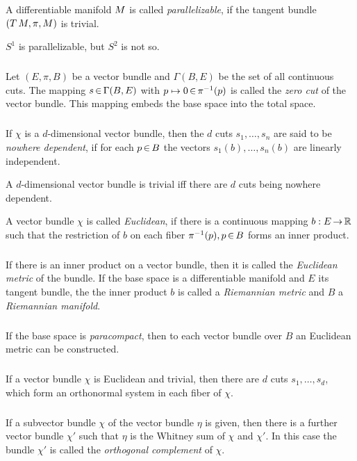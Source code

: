\documentclass[11pt,twoside]{article}
\begin{document}
\begin{definition}
A differentiable manifold ${M}$ is called \textit{parallelizable},
if the tangent bundle $(T\,{M},\pi,{M})$ is trivial.
\end{definition}

\begin{example}
$S^1$ is parallelizable, but $S^2$ is not so.
\end{example}

\subparagraph{}
Let $(E,\pi,B)$ be a vector bundle
and $\Gamma(B,E)$ be the set of all continuous cuts.
The mapping $s {\,\in\,} \Gamma(B,E)$ with $p \mapsto 0 {\,\in\,} \pi^{-1}(p)$
is called the \textit{zero cut} of the vector bundle.
This mapping embeds the base space into the total space.

\subparagraph{}
If $\chi$ is a $d$-dimensional vector bundle,
then the $d$ cuts $s_1,\ldots,s_n$ are said to be \textit{nowhere dependent},
if for each $p {\,\in\,} B$
the vectors $s_1(b),\ldots,s_n(b)$ are linearly independent.

\begin{theorem}
A $d$-dimensional vector bundle is trivial
iff there are $d$ cuts being nowhere dependent.
\end{theorem}

\begin{definition}
A vector bundle $\chi$ is called \textit{Euclidean},
if there is a continuous mapping $b:E {\,\to\,} {\mathbb{R}}$
such that
the restriction of $b$ on each fiber $\pi^{-1}(p), p {\,\in\,} B$
forms an inner product.
\end{definition}

\subparagraph{}
If there is an inner product on a vector bundle,
then it is called the \textit{Euclidean metric} of the bundle.
If the base space is a differentiable manifold
and $E$ its tangent bundle,
the the inner product $b$ is called a \textit{Riemannian metric}
and $B$ a \textit{Riemannian manifold}.

\subparagraph{}
If the base space is \textit{paracompact},
then to each vector bundle over $B$ an Euclidean metric can be constructed.

\subparagraph{}
If a vector bundle $\chi$ is Euclidean and trivial,
then there are $d$ cuts $s_1,\ldots,s_d$,
which form an orthonormal system in each fiber of $\chi$.

\subparagraph{}
If a subvector bundle $\chi$ of the vector bundle $\eta$ is given,
then there is a further vector bundle $\chi'$
such that
$\eta$ is the Whitney sum of $\chi$ and $\chi'$.
In this case the bundle $\chi'$ is called the \textit{orthogonal complement}
of $\chi$.
\end{document}
